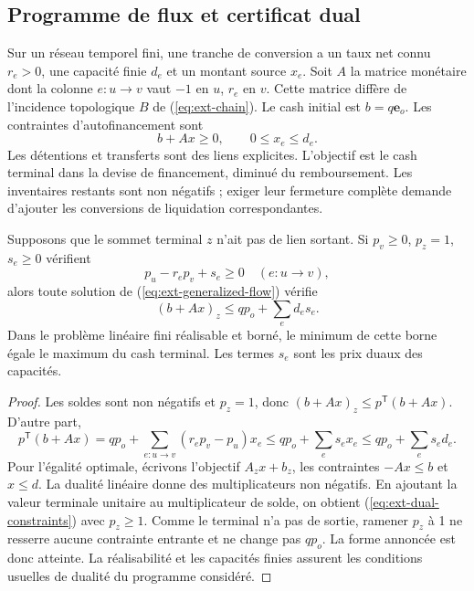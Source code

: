 \subsection{Programme de flux et certificat dual}

Sur un réseau temporel fini, une tranche de conversion a un taux net connu \(r_e>0\), une capacité finie \(d_e\) et un montant source \(x_e\). Soit \(A\) la matrice monétaire dont la colonne \(e:u\to v\) vaut \(-1\) en \(u\), \(r_e\) en \(v\). Cette matrice diffère de l'incidence topologique \(B\) de (\ref{eq:ext-chain}). Le cash initial est \(b=q\mathbf e_o\). Les contraintes d'autofinancement sont
\begin{equation}
 b+Ax\ge0,\qquad 0\le x_e\le d_e.
 \label{eq:ext-generalized-flow}
\end{equation}
Les détentions et transferts sont des liens explicites. L'objectif est le cash terminal dans la devise de financement, diminué du remboursement. Les inventaires restants sont non négatifs ; exiger leur fermeture complète demande d'ajouter les conversions de liquidation correspondantes.

\begin{proposition}
Supposons que le sommet terminal \(z\) n'ait pas de lien sortant. Si \(p_v\ge0\), \(p_z=1\), \(s_e\ge0\) vérifient
\begin{equation}
 p_u-r_ep_v+s_e\ge0\quad(e:u\to v),
 \label{eq:ext-dual-constraints}
\end{equation}
alors toute solution de (\ref{eq:ext-generalized-flow}) vérifie
\begin{equation}
 (b+Ax)_z\le qp_o+\sum_e d_es_e.
 \label{eq:ext-flow-dual}
\end{equation}
Dans le problème linéaire fini réalisable et borné, le minimum de cette borne égale le maximum du cash terminal. Les termes \(s_e\) sont les prix duaux des capacités.
\end{proposition}
\begin{proof}
Les soldes sont non négatifs et \(p_z=1\), donc \((b+Ax)_z\le p^{\mathsf T}(b+Ax)\). D'autre part,
\[
 p^{\mathsf T}(b+Ax)=qp_o+\sum_{e:u\to v}(r_ep_v-p_u)x_e
 \le qp_o+\sum_es_ex_e\le qp_o+\sum_es_ed_e.
\]
Pour l'égalité optimale, écrivons l'objectif \(A_zx+b_z\), les contraintes \(-Ax\le b\) et \(x\le d\). La dualité linéaire donne des multiplicateurs non négatifs. En ajoutant la valeur terminale unitaire au multiplicateur de solde, on obtient (\ref{eq:ext-dual-constraints}) avec \(p_z\ge1\). Comme le terminal n'a pas de sortie, ramener \(p_z\) à 1 ne resserre aucune contrainte entrante et ne change pas \(qp_o\). La forme annoncée est donc atteinte. La réalisabilité et les capacités finies assurent les conditions usuelles de dualité du programme considéré.
\end{proof}

